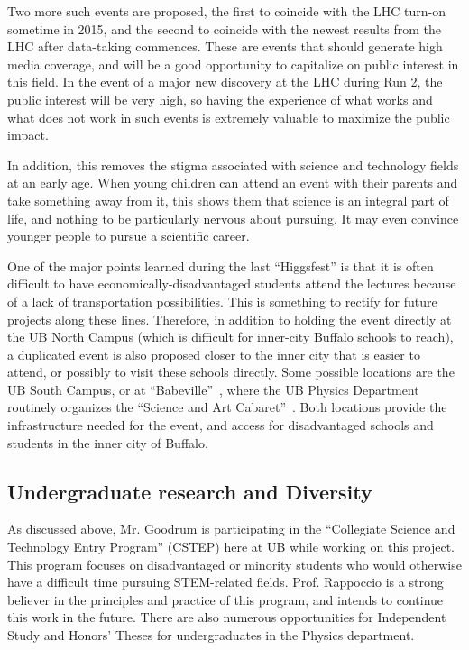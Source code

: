 \documentclass[times,11pt]{article}
\begin{document}
Two more such events are proposed, the first to coincide with the LHC
turn-on sometime in 2015, and the second to coincide with the newest
results from the LHC after data-taking commences. These are 
events that should generate high media coverage, and will be a good
opportunity to capitalize on public interest in this field.
In the event of a major new discovery at the LHC
during Run 2, the public interest will be very high, so having the
experience of what works and what does not work in such events is
extremely valuable to maximize the public impact. 

In addition, this removes the stigma associated with science and
technology fields at an early age. When young children can attend an
event with their parents and take something away from it, this shows
them that science is an integral part of life, and nothing to be
particularly nervous about pursuing. It may even convince younger
people to pursue a scientific career. 

One of the major points learned during the last ``Higgsfest''
is that it is often difficult to have economically-disadvantaged
students attend the lectures because of a lack of transportation
possibilities. This is something to rectify for future
projects along these lines. Therefore, in addition to holding the
event directly
at the UB North Campus (which is difficult for inner-city
Buffalo schools to reach), a duplicated event is also proposed
closer to the inner city that is easier to attend, or possibly to
visit these schools directly. Some possible
locations are the UB South Campus, or at
``Babeville''~\cite{babeville}, where the UB Physics
Department routinely organizes the ``Science and Art
Cabaret''~\cite{cabaret}. Both locations 
provide the infrastructure needed for the event, and
access for disadvantaged schools and students in the inner city of
Buffalo. 




\subsection{Undergraduate research and Diversity}

As discussed above, Mr. Goodrum is participating in the
``Collegiate Science and Technology Entry Program'' (CSTEP) here at
UB while working on this project. This program focuses on
disadvantaged or minority students who would otherwise have a
difficult time pursuing STEM-related fields. Prof. Rappoccio is a
strong believer in the principles and practice of this program, and
intends to continue this work in the future. 
There are also numerous opportunities for Independent Study and
Honors' Theses for undergraduates in the Physics department. 
\end{document}
